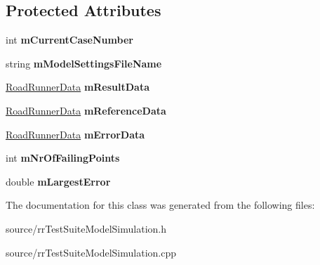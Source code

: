 \subsection*{Protected Attributes}
\begin{DoxyCompactItemize}
\item 
\hypertarget{classrr_1_1_test_suite_model_simulation_abd1ea039542d15f2f0acdc7a76ec3ac4}{int {\bfseries m\-Current\-Case\-Number}}\label{classrr_1_1_test_suite_model_simulation_abd1ea039542d15f2f0acdc7a76ec3ac4}

\item 
\hypertarget{classrr_1_1_test_suite_model_simulation_a123607f10a4785304b6797a42d676451}{string {\bfseries m\-Model\-Settings\-File\-Name}}\label{classrr_1_1_test_suite_model_simulation_a123607f10a4785304b6797a42d676451}

\item 
\hypertarget{classrr_1_1_test_suite_model_simulation_a701149b4c7cac375879822be5ad923e3}{\hyperlink{classrr_1_1_road_runner_data}{Road\-Runner\-Data} {\bfseries m\-Result\-Data}}\label{classrr_1_1_test_suite_model_simulation_a701149b4c7cac375879822be5ad923e3}

\item 
\hypertarget{classrr_1_1_test_suite_model_simulation_ae07d99464dec480b77ac4f703e8bac52}{\hyperlink{classrr_1_1_road_runner_data}{Road\-Runner\-Data} {\bfseries m\-Reference\-Data}}\label{classrr_1_1_test_suite_model_simulation_ae07d99464dec480b77ac4f703e8bac52}

\item 
\hypertarget{classrr_1_1_test_suite_model_simulation_aa57d0d1247e9420a6dca9313b9cc18e6}{\hyperlink{classrr_1_1_road_runner_data}{Road\-Runner\-Data} {\bfseries m\-Error\-Data}}\label{classrr_1_1_test_suite_model_simulation_aa57d0d1247e9420a6dca9313b9cc18e6}

\item 
\hypertarget{classrr_1_1_test_suite_model_simulation_a59fd59a407df17e843db1d084ee297c9}{int {\bfseries m\-Nr\-Of\-Failing\-Points}}\label{classrr_1_1_test_suite_model_simulation_a59fd59a407df17e843db1d084ee297c9}

\item 
\hypertarget{classrr_1_1_test_suite_model_simulation_ad2bbd3e128e592886ffe884656115a95}{double {\bfseries m\-Largest\-Error}}\label{classrr_1_1_test_suite_model_simulation_ad2bbd3e128e592886ffe884656115a95}

\end{DoxyCompactItemize}


The documentation for this class was generated from the following files\-:\begin{DoxyCompactItemize}
\item 
source/rr\-Test\-Suite\-Model\-Simulation.\-h\item 
source/rr\-Test\-Suite\-Model\-Simulation.\-cpp\end{DoxyCompactItemize}
